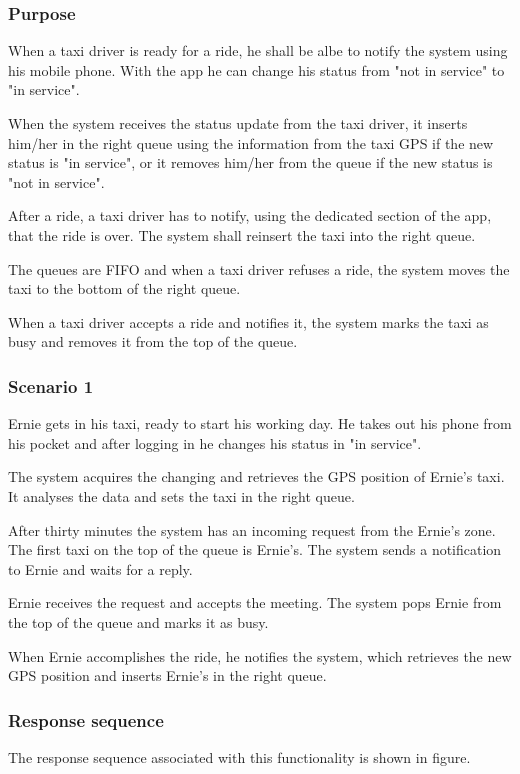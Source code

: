 \label{taxi-availability}
\subsubsection{Purpose}

When a taxi driver is ready for a ride, he shall be albe to notify the system using his mobile phone. With the app he can change his status from "not in service" to "in service".

When the system receives the status update from the taxi driver, it inserts him/her in the right queue using the information from the taxi GPS if the new status is "in service", or it removes him/her from the queue if the new status is "not in service".

After a ride, a taxi driver has to notify, using the dedicated section of the app, that the ride is over. The system shall reinsert the taxi into the right queue.

The queues are FIFO and when a taxi driver refuses a ride, the system moves the taxi to the bottom of the right queue.

When a taxi driver accepts a ride and notifies it, the system marks the taxi as busy and removes it from the top of the queue.

\subsubsection{Scenario 1}
Ernie gets in his taxi, ready to start his working day. He takes out his phone from his pocket and after logging in he changes his status in "in service".

The system acquires the changing and retrieves the GPS position of Ernie's taxi. It analyses the data and sets the taxi in the right queue.

After thirty minutes the system has an incoming request from the Ernie's zone. The first taxi on the top of the queue is Ernie's. The system sends a notification to Ernie and waits for a reply.

Ernie receives the request and accepts the meeting. The system pops Ernie from the top of the queue and marks it as busy.

When Ernie accomplishes the ride, he notifies the system, which retrieves the new GPS position and inserts Ernie's in the right queue.

\subsubsection{Response sequence}
The response sequence associated with this functionality is shown in figure.

